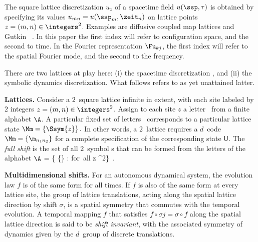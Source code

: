
\renewcommand{\shift}{\ensuremath{\sigma}}
\renewcommand{\Xx}{\ensuremath{\mathsf{U}}}

The square lattice discretization $u_z$ of a spacetime field $u(\ssp,\tau)$ is
obtained by
specifying its values $u_{mn}= u(\ssp_m, \zeit_n)$ on lattice points $z=(m,n)
\in \integers^2$. Examples are diffusive coupled map
lattices and Gutkin \etal\ \catlatt{}.
In this paper the first index will refer to configuration space, and the second to time.
In the Fourier representation $\Fu_{kj}$, the first index will refer to the spatial
Fourier mode, and the second to the frequency.

There are two lattices at play here: (i) the spacetime discretization
, and (ii) the symbolic dynamics discretization. What follows refers
to as yet unattained latter.

{\bf Lattices.}
Consider a $2$\dmn\ square lattice infinite in extent, with each site
labeled by $2$ integers $z=(m,n)\in \integers^{2}$. Assign to each site $z$ a
letter \ from a finite alphabet $\A$. A particular fixed set
of letters  \ corresponds to a particular lattice state
\(
\Mm= \{\Ssym{z}\} %
\,.
\)
In other words, a $2$\dmn\ lattice requires a {$d$\dmn\ code}
\(
\Mm = \{\m_{n_1 n_2}\}
\)
for a complete specification of the corresponding state $\Xx$.
The {\em full shift} is the set of all $2$\dmn\
symbol \brick s that can be formed from the letters of the alphabet $\A$
\beq
\hat{\AdmItnr} = \{ \{\} %
              : \Ssym{z} \in \A \quad \mbox{for all} \quad z \in  \integers^2\}
\,.

{\bf Multidimensional shifts.}
For an autonomous dynamical system, the evolution law $f$ is of the same form for all times.
If $f$ is also of the same form at every lattice site, the
group of lattice translations, acting along the spatial lattice direction by
shift \shift{}, is a spatial symmetry that commutes with the temporal
evolution. A temporal mapping $f$ that satisfies
$f\circ\shift{j}=\shift{}\circ{f}$ along the spatial lattice
direction is said to be {\em shift invariant}, with the associated
symmetry of dynamics given by the $d$\dmn\ group of discrete
{\spt} translations.

